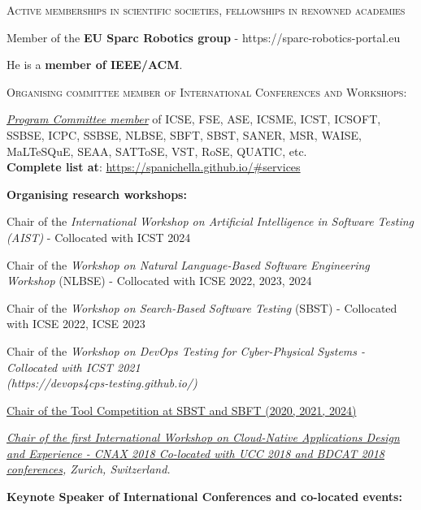 \documentclass[11pt]{article}
\begin{document}
\textsc{Active memberships in scientific societies, fellowships in renowned academies}

\begin{innerlist}
\item Member of the \textbf{EU Sparc Robotics group} - https://sparc-robotics-portal.eu
\item  He is a \textbf{member of IEEE/ACM}.
\end{innerlist}

\medskip\medskip 
\textsc{Organising committee member of International Conferences and Workshops:}
\medskip 
\begin{innerlist}
 \item \href{https://spanichella.github.io/#services}{\textit{Program Committee member}} of ICSE, FSE, ASE, ICSME, ICST, ICSOFT, SSBSE, ICPC, SSBSE, NLBSE, SBFT, SBST, SANER, MSR, WAISE, MaLTeSQuE, SEAA, SATToSE, VST, RoSE, QUATIC, etc.  \\\textbf{Complete list at}: \href{https://spanichella.github.io/\#services}{https://spanichella.github.io/\#services}
 \end{innerlist}
\medskip 
\textbf{Organising research workshops:}
\begin{innerlist}
\item Chair of the \textit{International Workshop on Artificial Intelligence in Software Testing (AIST)} - Collocated with ICST 2024
\item Chair of the \textit{Workshop on Natural Language-Based Software Engineering Workshop} (NLBSE) - Collocated with ICSE 2022, 2023, 2024
\item Chair of  the \textit{Workshop on Search-Based Software Testing} (SBST) - Collocated with ICSE 2022, ICSE 2023
\item Chair of the \textit{Workshop on DevOps Testing for Cyber-Physical Systems - Collocated with ICST 2021 \\(https://devops4cps-testing.github.io/)} 
\item \href{}
{Chair of the Tool Competition at SBST and SBFT (2020, 2021, 2024)} 
       \item \emph{\href{http://cnax.servicelaboratory.ch/}
                   {\textit{Chair of the first International Workshop on Cloud-Native Applications Design and Experience - CNAX 2018
Co-located with UCC 2018 and BDCAT 2018 conferences}}, Zurich, Switzerland.}
\end{innerlist}
\medskip 
\textbf{Keynote Speaker of International Conferences and co-located events:}
\end{document}
